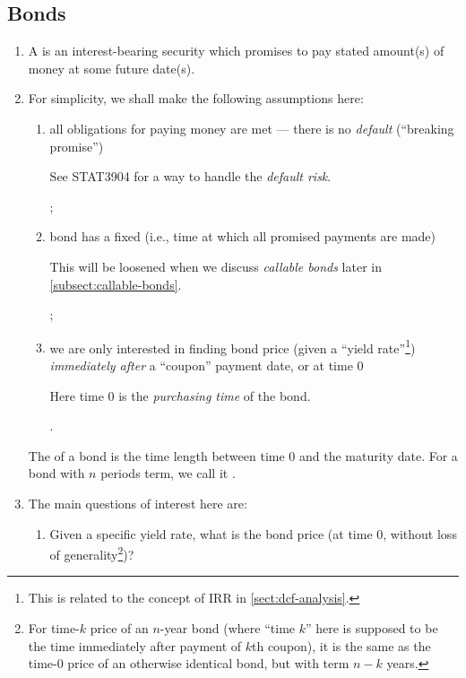 \subsection{Bonds}
\begin{enumerate}
\item A  is an interest-bearing security which promises to pay
stated amount(s) of money at some future date(s).

\item For simplicity, we shall make the
following assumptions here:
\begin{enumerate}
\item all obligations for paying money are met --- there is no \emph{default}
(``breaking promise'') \begin{note}
See STAT3904 for a way to handle the \emph{default risk}.
\end{note};
\item bond has a fixed  (i.e., time at which all promised
payments are made)
\begin{note}
This will be loosened when we discuss
\emph{callable bonds} later in \cref{subsect:callable-bonds}.
\end{note};
\item we are only interested in finding bond price (given a ``yield
rate''\footnote{This is related to the concept of IRR in
\cref{sect:dcf-analysis}.}) \emph{immediately after} a ``coupon'' payment date,
or at time 0 \begin{note} Here time 0 is the \emph{purchasing time} of the
bond.
\end{note}.
\end{enumerate}
\begin{note}
The  of a bond is the time length between time 0 and the maturity date.
For a bond with \(n\) periods term, we call it .
\end{note}
\item \label{it:bond-main-qs}
The main questions of interest here are:
\begin{enumerate}
\item Given a specific yield rate, what is the bond price (at time 0, without
loss of generality\footnote{For time-\(k\) price of an \(n\)-year bond (where
``time \(k\)'' here is supposed to be the time immediately after payment of
\(k\)th coupon), it is the same as the time-0 price of an otherwise identical
bond, but with term \(n-k\) years.})?


\end{enumerate}
\end{enumerate}
